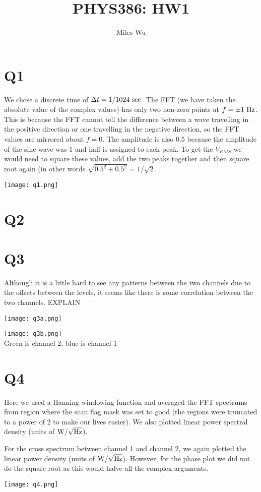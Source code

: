 \documentclass[12pt]{article}
\begin{document}
\title{PHYS386: HW1}
\author{Miles Wu}
\maketitle

\section{Q1}
We chose a discrete time of $\Delta t = 1/1024~\textnormal{sec}$. The FFT (we have taken the absolute value of the complex values) has only two non-zero points at $f = \pm 1~\textnormal{Hz}$. This is because the FFT cannot tell the difference between a wave travelling in the positive direction or one travelling in the negative direction, so the FFT values are mirrored about $f=0$. The amplitude is also $0.5$ because the amplitude of the sine wave was $1$ and half is assigned to each peak. To get the $V_{RMS}$ we would need to square these values, add the two peaks together and then square root again (in other words $\sqrt{0.5^2+0.5^2} = 1/\sqrt{2}$.

\begin{center}
\texttt{[image: q1.png]}
\end{center}

\section{Q2}

\section{Q3}
Although it is a little hard to see any patterns between the two channels due to the offsets between the levels, it seems like there is some correlation between the two channels.
EXPLAIN
\begin{center}
\texttt{[image: q3a.png]}
\end{center}
\begin{center}
\texttt{[image: q3b.png]}\\
Green is channel 2, blue is channel 1 
\end{center}


\section{Q4}
Here we used a Hanning windowing function and averaged the FFT spectrums from region where the scan flag mask was set to good (the regions were truncated to a power of 2 to make our lives easier). We also plotted linear power spectral density (units of $\textnormal{W}/\sqrt{\textnormal{Hz}}$).

For the cross spectrum between channel 1 and channel 2, we again plotted the linear power density (units of $\textnormal{W}/\sqrt{\textnormal{Hz}}$). However, for the phase plot we did not do the square root as this would halve all the complex arguments.
\begin{center}
\texttt{[image: q4.png]}
\end{center}
\end{document}
